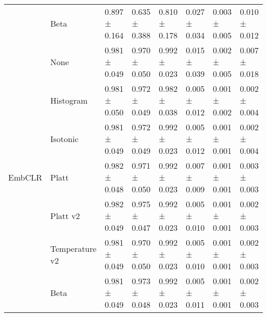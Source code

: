 \begin{tabular}{llllllll}
 & Beta & 0.897 ± 0.164 & 0.635 ± 0.388 & 0.810 ± 0.178 & 0.027 ± 0.034 & 0.003 ± 0.005 & 0.010 ± 0.012 \\
\cline{1-8}
\multirow[t]{7}{*}{EmbCLR} & None & 0.981 ± 0.049 & 0.970 ± 0.050 & 0.992 ± 0.023 & 0.015 ± 0.039 & 0.002 ± 0.005 & 0.007 ± 0.018 \\
 & Histogram & 0.981 ± 0.050 & 0.972 ± 0.049 & 0.982 ± 0.038 & 0.005 ± 0.012 & 0.001 ± 0.002 & 0.002 ± 0.004 \\
 & Isotonic & 0.981 ± 0.049 & 0.972 ± 0.049 & 0.992 ± 0.023 & 0.005 ± 0.012 & 0.001 ± 0.001 & 0.002 ± 0.004 \\
 & Platt & 0.982 ± 0.048 & 0.971 ± 0.050 & 0.992 ± 0.023 & 0.007 ± 0.009 & 0.001 ± 0.001 & 0.003 ± 0.003 \\
 & Platt v2 & 0.982 ± 0.049 & 0.975 ± 0.047 & 0.992 ± 0.023 & 0.005 ± 0.010 & 0.001 ± 0.001 & 0.002 ± 0.003 \\
 & Temperature v2 & 0.981 ± 0.049 & 0.970 ± 0.050 & 0.992 ± 0.023 & 0.005 ± 0.010 & 0.001 ± 0.001 & 0.002 ± 0.003 \\
 & Beta & 0.981 ± 0.049 & 0.973 ± 0.048 & 0.992 ± 0.023 & 0.005 ± 0.011 & 0.001 ± 0.001 & 0.002 ± 0.003 \\
\cline{1-8}
\bottomrule
\end{tabular}
